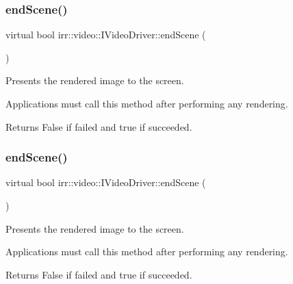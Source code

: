 \subsubsection{\texorpdfstring{end\+Scene()}{endScene()}\hspace{0.1cm}{\footnotesize\ttfamily [1/2]}}
{\footnotesize\ttfamily virtual bool irr\+::video\+::\+I\+Video\+Driver\+::end\+Scene (\begin{DoxyParamCaption}{ }\end{DoxyParamCaption})\hspace{0.3cm}{\ttfamily [pure virtual]}}



Presents the rendered image to the screen. 

Applications must call this method after performing any rendering. \begin{DoxyReturn}{Returns}
False if failed and true if succeeded. 
\end{DoxyReturn}
\mbox{\label{classirr_1_1video_1_1IVideoDriver_a75f61a93c5fc9fdf161c044d27bc994e}} 
\subsubsection{\texorpdfstring{end\+Scene()}{endScene()}\hspace{0.1cm}{\footnotesize\ttfamily [2/2]}}
{\footnotesize\ttfamily virtual bool irr\+::video\+::\+I\+Video\+Driver\+::end\+Scene (\begin{DoxyParamCaption}{ }\end{DoxyParamCaption})\hspace{0.3cm}{\ttfamily [pure virtual]}}



Presents the rendered image to the screen. 

Applications must call this method after performing any rendering. \begin{DoxyReturn}{Returns}
False if failed and true if succeeded. 
\end{DoxyReturn}
\mbox{\label{classirr_1_1video_1_1IVideoDriver_a9b7b5942cf2378f9f96d47ec7a0cd881}} 
